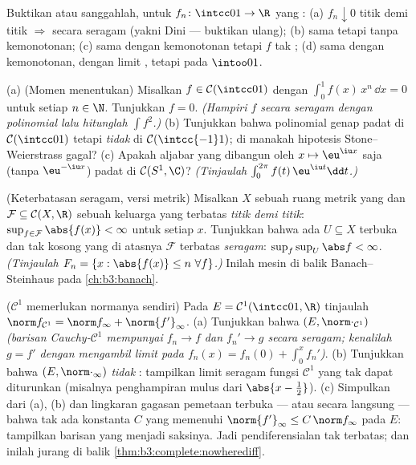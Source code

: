 \begin{exercise}[$\star\star$]\label{exo:b3:complete:8}
Buktikan atau sanggahlah, untuk $f_n \colon \intcc01 \to \R$ yang :
(a) $f_n \downarrow 0$ titik demi titik $\Rightarrow$ secara seragam (yakni Dini
--- buktikan ulang); (b) sama tetapi tanpa kemonotonan; (c) sama dengan
kemonotonan tetapi $f$ tak ; (d) sama dengan kemonotonan,
dengan limit , tetapi pada $\intoo01$.
\end{exercise}

\begin{exercise}[$\star\star$]\label{exo:b3:complete:9}
(a) (Momen menentukan) Misalkan $f \in \mathcal C(\intcc01)$ dengan
$\int_0^1 f(x)\,x^n\,\dd x = 0$ untuk setiap $n \in \N$. Tunjukkan $f =
0$. \emph{(Hampiri $f$ secara seragam dengan polinomial lalu hitunglah
$\int f^2$.)}
(b) Tunjukkan bahwa polinomial genap padat di $\mathcal
C(\intcc01)$ tetapi \emph{tidak} di $\mathcal C(\intcc{-1}1)$; di manakah
hipotesis Stone--Weierstrass gagal?
(c) Apakah aljabar yang dibangun oleh $x \mapsto \eu^{\iu x}$ saja
(tanpa $\eu^{-\iu x}$) padat di $\mathcal C(S^1, \C)$?
\emph{(Tinjaulah $\int_0^{2\pi}f(t)\,\eu^{\iu t}\dd t$.)}
\end{exercise}

\begin{exercise}[$\star\star\star$]\label{exo:b3:complete:10}
(Keterbatasan seragam, versi metrik) Misalkan $X$ sebuah ruang metrik
yang  dan $\mathcal F \subseteq \mathcal C(X, \R)$ sebuah
keluarga yang terbatas \emph{titik demi titik}: $\sup_{f \in \mathcal
F}\abs{f(x)} < \infty$ untuk setiap $x$. Tunjukkan bahwa ada
$U \subseteq X$ terbuka dan tak kosong yang di atasnya $\mathcal F$ terbatas
\emph{seragam}: $\sup_{f}\sup_U \abs f < \infty$.
\emph{(Tinjaulah $F_n = \{x : \abs{f(x)} \leq n\ \forall f\}$.)}
Inilah mesin di balik Banach--Steinhaus pada
\cref{ch:b3:banach}.
\end{exercise}

\begin{exercise}[$\star\star$]\label{exo:b3:complete:11}
($\mathcal C^1$ memerlukan normanya sendiri) Pada $E = \mathcal
C^1(\intcc01, \R)$ tinjaulah $\norm f_{\mathcal C^1} = \norm
f_\infty + \norm{f'}_\infty$.
(a) Tunjukkan bahwa $(E, \norm\cdot_{\mathcal C^1})$ 
\emph{(barisan Cauchy-$\mathcal C^1$ mempunyai $f_n \to f$ dan
$f_n' \to g$ secara seragam; kenalilah $g = f'$ dengan mengambil limit
pada $f_n(x) = f_n(0) + \int_0^xf_n'$)}.
(b) Tunjukkan bahwa $(E, \norm\cdot_\infty)$ \emph{tidak}
: tampilkan limit seragam fungsi $\mathcal C^1$
yang tak dapat diturunkan (misalnya penghampiran mulus dari
$\abs{x - \tfrac12}$).
(c) Simpulkan dari (a), (b) dan lingkaran gagasan pemetaan terbuka
--- atau secara langsung --- bahwa tak ada konstanta $C$ yang memenuhi
$\norm{f'}_\infty \leq C\,\norm f_\infty$ pada $E$: tampilkan
barisan yang menjadi saksinya. Jadi pendiferensialan tak terbatas; dan inilah
jurang di balik \cref{thm:b3:complete:nowherediff}.
\end{exercise}

